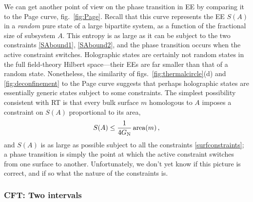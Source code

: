 \documentclass[11pt]{article}
\DeclareMathOperator{\area}{area}
\begin{document}
We can get another point of view on the phase transition in EE by comparing it to the Page curve, fig.\ \ref{fig:Page}. Recall that this curve represents the EE $S(A)$ in a \emph{random} pure state of a large bipartite system, as a function of the fractional size of subsystem $A$. This entropy is as large as it can be subject to the two constraints \eqref{SAbound1}, \eqref{SAbound2}, and the phase transition occurs when the active constraint switches. Holographic states are certainly not random states in the full field-theory Hilbert space---their EEs are far smaller than that of a random state. Nonetheless, the similarity of figs.\ \ref{fig:thermalcircle}(d) and \ref{fig:deconfinement} to the Page curve suggests that perhaps holographic states are essentially generic states subject to some constraints. The simplest possibility consistent with RT is that every bulk surface $m$ homologous to $A$ imposes a constraint on $S(A)$ proportional to its area,
\begin{equation}\label{surfconstraints}
S(A) \le \frac1{4G_{\rm N}}\area(m)\,,
\end{equation}
and $S(A)$ is as large as possible subject to all the constraints \eqref{surfconstraints}; a phase transition is simply the point at which the active constraint switches from one surface to another. Unfortunately, we don't yet know if this picture is correct, and if so what the nature of the constraints is.




\subsubsection{CFT: Two intervals}
\label{sec:MI holography}
\end{document}

